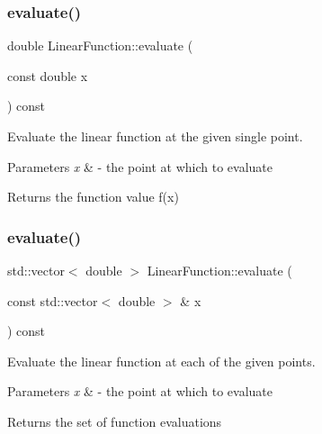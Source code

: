 \subsubsection{\texorpdfstring{evaluate()}{evaluate()}\hspace{0.1cm}{\footnotesize\ttfamily [1/2]}}
{\footnotesize\ttfamily double Linear\+Function\+::evaluate (\begin{DoxyParamCaption}\item[{const double}]{x }\end{DoxyParamCaption}) const}

Evaluate the linear function at the given single point.


\begin{DoxyParams}{Parameters}
{\em x} & -\/ the point at which to evaluate \\
\hline
\end{DoxyParams}
\begin{DoxyReturn}{Returns}
the function value f(x) 
\end{DoxyReturn}
\hypertarget{class_linear_function_a8c0653b32046a1c0b6b41b1d01128bec}{}\label{class_linear_function_a8c0653b32046a1c0b6b41b1d01128bec} 
\subsubsection{\texorpdfstring{evaluate()}{evaluate()}\hspace{0.1cm}{\footnotesize\ttfamily [2/2]}}
{\footnotesize\ttfamily std\+::vector$<$ double $>$ Linear\+Function\+::evaluate (\begin{DoxyParamCaption}\item[{const std\+::vector$<$ double $>$ \&}]{x }\end{DoxyParamCaption}) const}

Evaluate the linear function at each of the given points.


\begin{DoxyParams}{Parameters}
{\em x} & -\/ the point at which to evaluate \\
\hline
\end{DoxyParams}
\begin{DoxyReturn}{Returns}
the set of function evaluations 
\end{DoxyReturn}
\hypertarget{class_linear_function_a02be84eb14f948b2d938f0a9deb9ff37}{}\label{class_linear_function_a02be84eb14f948b2d938f0a9deb9ff37} 

